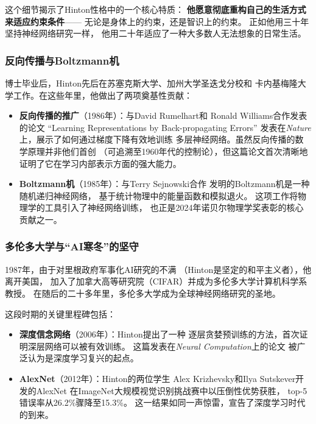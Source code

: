 这个细节揭示了Hinton性格中的一个核心特质：
\textbf{他愿意彻底重构自己的生活方式来适应约束条件}——
无论是身体上的约束，还是智识上的约束。
正如他用三十年坚持神经网络研究一样，
他用二十年适应了一种大多数人无法想象的日常生活。

\subsubsection{反向传播与Boltzmann机}
博士毕业后，Hinton先后在苏塞克斯大学、加州大学圣迭戈分校和
卡内基梅隆大学工作。在这些年里，他做出了两项奠基性贡献：

\begin{itemize}[noitemsep]
  \item \textbf{反向传播的推广}（1986年）：与David Rumelhart和
    Ronald Williams合作发表的论文
    ``Learning Representations by Back-propagating Errors''
    发表在\textit{Nature}上，展示了如何通过梯度下降有效地训练
    多层神经网络。虽然反向传播的数学原理并非他们首创
    （可追溯至1960年代的控制论），但这篇论文首次清晰地
    证明了它在学习内部表示方面的强大能力。
  \item \textbf{Boltzmann机}（1985年）：与Terry Sejnowski合作
    发明的Boltzmann机是一种随机递归神经网络，
    基于统计物理中的能量函数和模拟退火。
    这项工作将物理学的工具引入了神经网络训练，
    也正是2024年诺贝尔物理学奖表彰的核心贡献之一。
\end{itemize}

\subsubsection{多伦多大学与``AI寒冬''的坚守}
1987年，由于对里根政府军事化AI研究的不满
（Hinton是坚定的和平主义者），他离开美国，
加入了加拿大高等研究院（CIFAR）并成为多伦多大学计算机科学系教授。
在随后的二十多年里，多伦多大学成为全球神经网络研究的圣地。

这段时期的关键里程碑包括：
\begin{itemize}[noitemsep]
  \item \textbf{深度信念网络}（2006年）：Hinton提出了一种
    逐层贪婪预训练的方法，首次证明深层网络可以被有效训练。
    这篇发表在\textit{Neural Computation}上的论文
    被广泛认为是深度学习复兴的起点。
  \item \textbf{AlexNet}（2012年）：Hinton的两位学生
    Alex Krizhevsky和Ilya Sutskever开发的AlexNet
    在ImageNet大规模视觉识别挑战赛中以压倒性优势获胜，
    top-5错误率从26.2\%骤降至15.3\%。
    这一结果如同一声惊雷，宣告了深度学习时代的到来。
\end{itemize}

